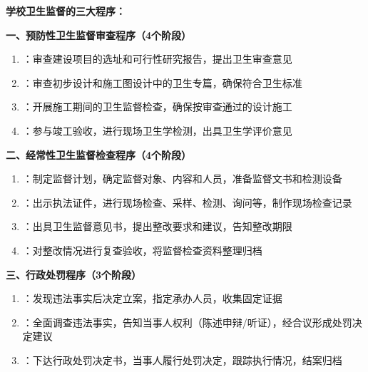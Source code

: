 \begin{keybox}
\textbf{学校卫生监督的三大程序：}

\textbf{一、预防性卫生监督审查程序（4个阶段）}
\begin{enumerate}[leftmargin=*]
    \item {}：审查建设项目的选址和可行性研究报告，提出卫生审查意见
    \item {}：审查初步设计和施工图设计中的卫生专篇，确保符合卫生标准
    \item {}：开展施工期间的卫生监督检查，确保按审查通过的设计施工
    \item {}：参与竣工验收，进行现场卫生学检测，出具卫生学评价意见
\end{enumerate}

\textbf{二、经常性卫生监督检查程序（4个阶段）}
\begin{enumerate}[leftmargin=*]
    \item {}：制定监督计划，确定监督对象、内容和人员，准备监督文书和检测设备
    \item {}：出示执法证件，进行现场检查、采样、检测、询问等，制作现场检查记录
    \item {}：出具卫生监督意见书，提出整改要求和建议，告知整改期限
    \item {}：对整改情况进行复查验收，将监督检查资料整理归档
\end{enumerate}

\textbf{三、行政处罚程序（3个阶段）}
\begin{enumerate}[leftmargin=*]
    \item {}：发现违法事实后决定立案，指定承办人员，收集固定证据
    \item {}：全面调查违法事实，告知当事人权利（陈述申辩/听证），经合议形成处罚决定建议
    \item {}：下达行政处罚决定书，当事人履行处罚决定，跟踪执行情况，结案归档
\end{enumerate}
\end{keybox}

\newpage
